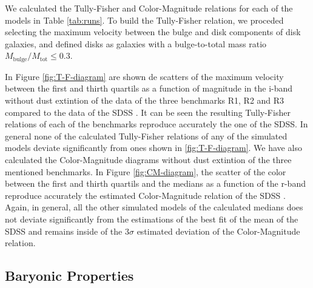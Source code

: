\documentclass[usenatbib]{mn2e}
\begin{document}
We calculated the Tully-Fisher and Color-Magnitude relations for each
of the models in Table \ref{tab:runs}.  To build the Tully-Fisher
relation, we proceded selecting the maximum velocity between the
bulge and disk components of disk galaxies, and defined disks as
galaxies  with a bulge-to-total mass ratio
$M_{\text{bulge}}/M_{\text{tot}}\le 0.3$.  

In Figure \ref{fig:T-F-diagram} are shown de scatters of the maximum
velocity  between the first and thirth quartils  as a function of
magnitude in  the i-band without dust extintion of the data of the
three benchmarks R1, R2 and R3 compared to the data of the SDSS
\citep{2007AJ....134..945P}. It can be seen the resulting Tully-Fisher
relations of each of the benchmarks reproduce accurately the one of
the SDSS. In general none of the calculated Tully-Fisher relations of
any of the simulated models deviate significantly from ones shown in
\ref{fig:T-F-diagram}. We have also calculated the Color-Magnitude
diagrams without dust extintion of the three mentioned benchmarks. In
Figure \ref{fig:CM-diagram}, the scatter of the color between the
first and thirth quartils and the medians as a function of the r-band
reproduce accurately the estimated Color-Magnitude relation of the
SDSS \citep{2012MNRAS.423.1583M}. Again, in general, all the other
simulated models of the calculated medians does not deviate
significantly from the estimations of the best fit of the mean of the
SDSS and remains inside of the $3\sigma$ estimated deviation of the
Color-Magnitude relation. 


\subsection{Baryonic Properties}
\end{document}
